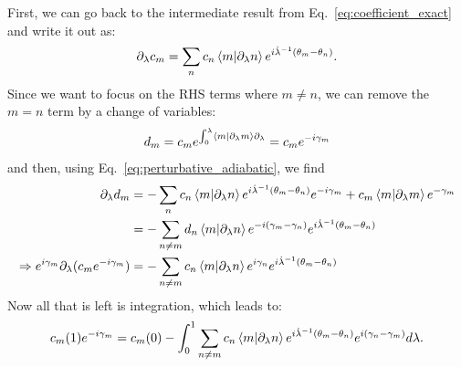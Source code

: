     First, we can go back to the intermediate result from Eq.~\eqref{eq:coefficient_exact} and write it out as:
    \begin{equation}\label{eq:perturbative_adiabatic}
        \partial_{\lambda} c_m = \sum_n c_n \braket{m}{\partial_{\lambda} n}e^{i\dot{\lambda}^{-1}(\theta_m - \theta_n)}.
    \end{equation}
    Since we want to focus on the RHS terms where $m \neq n$, we can remove the $m = n$ term by a change of variables:
    \begin{equation}\label{eq:changing_variables}
        d_m = c_m e^{\int_0^{\lambda}\braket{m}{\partial_{\lambda} m} \partial_{\lambda}} = c_m e^{-i\gamma_m}
    \end{equation}
    and then, using Eq.~\eqref{eq:perturbative_adiabatic}, we find
    \begin{equation}\label{eq:n_neq_m_terms}
        \begin{aligned}
            \partial_{\lambda} d_m &= - \sum_n c_n \braket{m}{\partial_{\lambda} n}e^{i\dot{\lambda}^{-1}(\theta_m - \theta_n)}e^{-i\gamma_m} + c_m \braket{m}{\partial_{\lambda} m} e^{-\gamma_m} \\
            &= - \sum_{n \neq m} d_n \braket{m}{\partial_{\lambda} n} e^{-i(\gamma_m - \gamma_n)} e^{i\dot{\lambda}^{-1}(\theta_m - \theta_n)} \\
            \Rightarrow{} e^{i\gamma_m} \partial_{\lambda}(c_m e^{-i\gamma_m}) &= - \sum_{n \neq m} c_n \braket{m}{\partial_{\lambda} n} e^{i \gamma_n} e^{i\dot{\lambda}^{-1}(\theta_m - \theta_n)}
        \end{aligned}
    \end{equation}
    Now all that is left is integration, which leads to:
    \begin{equation}\label{eq:adiabatic_coefficients_dyanmics}
        c_m(1)e^{-i\gamma_m} = c_m(0) - \int_0^1 \sum_{n \neq m} c_n \braket{m}{\partial_{\lambda} n} e^{i\dot{\lambda}^{-1}(\theta_m - \theta_n)} e^{i(\gamma_n - \gamma_m)} d \lambda.
    \end{equation}

